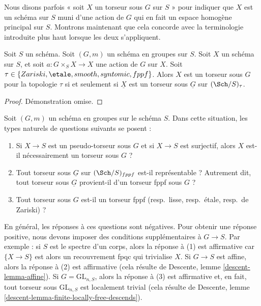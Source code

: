 \noindent
Nous disons parfois « soit $X$ un torseur sous $G$ sur $S$ » pour indiquer que
$X$ est un schéma sur $S$ muni d'une action de $G$ qui en fait
un espace homogène principal sur $S$.
Montrons maintenant que cela concorde avec la terminologie introduite plus haut
lorsque les deux s'appliquent.

\begin{lemma}
\label{lemma-torsor}
Soit $S$ un schéma.
Soit $(G, m)$ un schéma en groupes sur $S$.
Soit $X$ un schéma sur $S$, et soit
$a : G \times_S X \to X$ une action de $G$ sur $X$.
Soit $\tau \in\allowbreak \{Zariski,\allowbreak \etale,\allowbreak smooth,\allowbreak syntomic,\allowbreak fppf\}$.
Alors $X$ est un torseur sous $G$ pour la topologie $\tau$ si et seulement si
$\underline{X}$ est un torseur sous $\underline{G}$ sur $(\Sch/S)_\tau$.
\end{lemma}

\begin{proof}
Démonstration omise.
\end{proof}

\begin{remark}
\label{remark-fun-with-torsors}
Soit $(G, m)$ un schéma en groupes sur le schéma $S$.
Dans cette situation, les types naturels de questions suivants se posent :
\begin{enumerate}
\item Si $X \to S$ est un pseudo-torseur sous $G$ et si $X \to S$ est surjectif,
alors $X$ est-il nécessairement un torseur sous $G$ ?
\item Tout torseur sous $\underline{G}$ sur $(\Sch/S)_{fppf}$ est-il
représentable ? Autrement dit, tout torseur sous $\underline{G}$
provient-il d'un torseur fppf sous $G$ ?
\item Tout torseur sous $G$ est-il un
torseur fppf (resp.\ lisse, resp.\ \'etale, resp.\ de Zariski) ?
\end{enumerate}
En général, les réponses à ces questions sont négatives. Pour obtenir une réponse positive,
nous devons imposer des conditions supplémentaires à $G \to S$.
Par exemple :
si $S$ est le spectre d'un corps, alors la réponse à (1) est affirmative
car $\{X \to S\}$ est alors un recouvrement fpqc qui trivialise $X$.
Si $G \to S$ est affine, alors la réponse à (2) est affirmative
(cela résulte de Descente, lemme \ref{descent-lemma-affine}).
Si $G = \text{GL}_{n, S}$, alors la réponse à (3) est affirmative
et, en fait, tout torseur sous $\text{GL}_{n, S}$ est localement trivial
(cela résulte de
Descente, lemme \ref{descent-lemma-finite-locally-free-descends}).
\end{remark}



